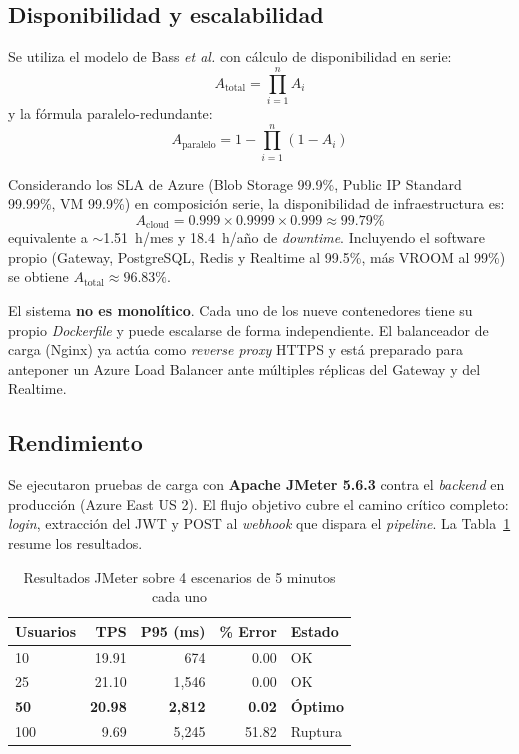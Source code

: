 \documentclass[conference]{IEEEtran}
\begin{document}
\subsection{Disponibilidad y escalabilidad}

Se utiliza el modelo de Bass \emph{et al.} \cite{bass2021} con c\'alculo de disponibilidad en serie:
\begin{equation}
A_{\text{total}} = \prod_{i=1}^{n} A_i
\end{equation}
y la f\'ormula paralelo-redundante:
\begin{equation}
A_{\text{paralelo}} = 1 - \prod_{i=1}^{n} (1 - A_i)
\end{equation}

Considerando los SLA de Azure \cite{azure-sla} (Blob Storage 99.9\%, Public IP Standard 99.99\%, VM 99.9\%) en composici\'on serie, la disponibilidad de infraestructura es:
\[
A_{\text{cloud}} = 0.999 \times 0.9999 \times 0.999 \approx \mathbf{99.79\%}
\]
equivalente a $\sim$1.51~h/mes y 18.4~h/a\~no de \emph{downtime}. Incluyendo el software propio (Gateway, PostgreSQL, Redis y Realtime al 99.5\%, m\'as VROOM al 99\%) se obtiene $A_{\text{total}} \approx \mathbf{96.83\%}$.

El sistema \textbf{no es monol\'itico}. Cada uno de los nueve contenedores tiene su propio \emph{Dockerfile} y puede escalarse de forma independiente. El balanceador de carga (Nginx) ya act\'ua como \emph{reverse proxy} HTTPS y est\'a preparado para anteponer un Azure Load Balancer ante m\'ultiples r\'eplicas del Gateway y del Realtime.

\subsection{Rendimiento}

Se ejecutaron pruebas de carga con \textbf{Apache JMeter 5.6.3} \cite{jmeter} contra el \emph{backend} en producci\'on (Azure East US 2). El flujo objetivo cubre el camino cr\'itico completo: \emph{login}, extracci\'on del JWT y POST al \emph{webhook} que dispara el \emph{pipeline}. La Tabla~\ref{tab:performance} resume los resultados.

\begin{table}[ht]
\caption{Resultados JMeter sobre 4 escenarios de 5 minutos cada uno}
\label{tab:performance}
\centering
\renewcommand{\arraystretch}{1.2}
\begin{tabular}{lrrrl}
\toprule
\textbf{Usuarios} & \textbf{TPS} & \textbf{P95 (ms)} & \textbf{\% Error} & \textbf{Estado} \\
\midrule
10 & 19.91 & 674 & 0.00 & OK \\
25 & 21.10 & 1{,}546 & 0.00 & OK \\
\textbf{50} & \textbf{20.98} & \textbf{2{,}812} & \textbf{0.02} & \textbf{\'Optimo} \\
100 & 9.69 & 5{,}245 & 51.82 & Ruptura \\
\bottomrule
\end{tabular}
\end{table}
\end{document}

